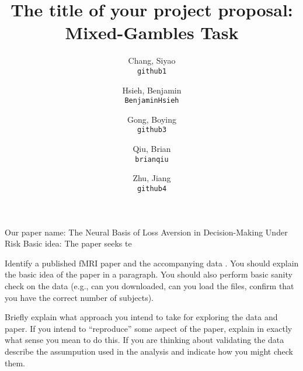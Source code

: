 \documentclass[11pt]{article}
\title{The title of your project proposal: Mixed-Gambles Task}
\author{

  Chang, Siyao\\
  \texttt{github1}
  \and
  Hsieh, Benjamin\\
  \texttt{BenjaminHsieh}
  \and
  Gong, Boying\\
  \texttt{github3}
  \and
  Qiu, Brian\\
  \texttt{brianqiu}
  \and
  Zhu, Jiang\\
  \texttt{github4}
}
\begin{document}
\maketitle
Our paper name: The Neural Basis of Loss Aversion in Decision-Making Under Risk
Basic idea: The paper seeks te

Identify a published fMRI paper and the accompanying data
\cite{lindquist2008statistical}.  You should explain the basic idea of the
paper in a paragraph.  You should also perform basic sanity check on the data
(e.g., can you downloaded, can you load the files, confirm that you have the
correct number of subjects).

Briefly explain what approach you intend to take for exploring
the data and paper.  If you intend to ``reproduce'' some aspect of the paper,
explain in exactly what sense you mean to do this.  If you are thinking about
validating the data describe the assumpution used in the analysis and indicate
how you might check them.


\end{document}

